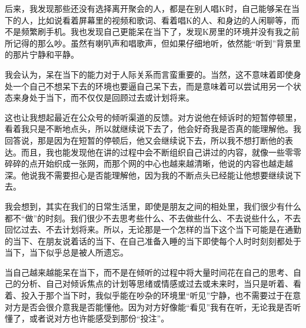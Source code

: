 后来，我发现那些还没有选择离开聚会的人，都是在别人唱K时，自己能够呆在当下的人，比如说看着屏幕里的视频和歌词、看着唱K的人、和身边的人闲聊等，而不是频繁刷手机。我也发现自己更能呆在当下了，发现K房里的环境并没有我之前所记得的那么吵。虽然有喇叭声和唱歌声，但如果仔细地听，依然能“听到”背景里的那片宁静和平静。

\tristarsepline

我会认为，呆在当下的能力对于人际关系而言蛮重要的。当然，这不意味着即使身处一个自己不想呆下去的环境也要逼自己呆下去，而是意味着可以尝试用另一个状态来身处于当下，而不仅仅是回顾过去或计划将来。

这也让我想起最近在公众号的倾听渠道的反馈。对方说他在倾诉时的短暂停顿里，看着我只是不断地点头，所以就继续说下去了，他会好奇我是否真的能理解他。我回答说，那是因为在短暂的停顿后，他又会继续说下去，所以我不想打断他的表达。而且，我也能发现他在讲的过程中会不断组织自己讲过的内容，就像一些零零碎碎的点开始织成一张网，而那个网的中心也越来越清晰，他说的内容也越走越深。他说我不需要担心是否能理解他，因为我的不断点头已经能让他想要继续说下去。

我会想到，其实在我们的日常生活里，即使是朋友之间的相处里，我们很少有什么都不“做”的时刻。我们很少不去思考些什么、不去做些什么、不去说些什么，不去回忆过去、不去计划将来。所以，无论那是一个怎样的当下\pozhehao{}这个当下可能是在通勤的当下、在朋友说着话的当下、在自己准备入睡的当下\pozhehao{}即使每个人时时刻刻都处于当下，当下似乎总是被人所遗忘。

当自己越来越能呆在当下，而不是在倾听的过程中将大量时间花在自己的思考、自己的分析、自己对倾诉焦点的计划等思绪或情感或过去或未来时，当只是听着、看着、投入于那个当下时，我似乎能在吵杂的环境里“听见”宁静，也不需要过于在意对方是否会很介意我是否能懂他。因为对方好像能“看见”我有在听，无论我是否听懂了，或者说对方也许能感受到那份“投注”。
